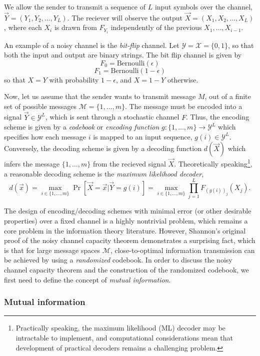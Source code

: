 We allow the sender to transmit a sequence of $L$ input symbols over
the channel, $\vec{Y} = (Y_1,Y_2,\hdots, Y_L)$. The reciever will observe the
output $\vec{X} = (X_1,X_2,\hdots, X_L)$, where each $X_i$ is drawn from
$F_{Y_i}$ independently of the previous $X_1,\hdots, X_{i-1}$.

An example of a noisy channel is the \emph{bit-flip} channel.
Let $\mathcal{Y} = \mathcal{X} = \{0,1\}$, so that both the input and output are binary strings.
The bit flip channel is given by
\[
F_0 = \text{Bernoulli}(\epsilon)
\]
\[
F_1 = \text{Bernoulli}(1-\epsilon)
\]
so that $X = Y$ with probability $1-\epsilon$, and $X = 1-Y$
otherwise.

Now, let us assume that the sender wants to transmit message $M$, out
of a finite set of possible messages $\mathcal{M} = \{1,\hdots, m\}$.
The message must be encoded into a signal $\vec{Y} \in \mathcal{Y}^L$,
which is sent through a stochastic channel $F$.  Thus, the encoding
scheme is given by a \emph{codebook} or \emph{encoding function} $g:
\{1,\hdots, m\} \to \mathcal{Y}^L$ which specifies how each message
$i$ is mapped to an input sequence, $g(i) \in \mathcal{Y}^L$.
Conversely, the decoding scheme is given by a decoding function
$d(\vec{X})$ which infers the message $\{1,\hdots, m\}$ from the
recieved signal $\vec{X}$.  Theoretically
speaking\footnote{Practically speaking, the maximum likelihood (ML)
  decoder may be intractable to implement, and computational
  considerations mean that development of practical decoders remains a
  challenging problem.}, a reasonable decoding scheme is the
\emph{maximum likelihood decoder},
\[
d(\vec{x}) = \max_{i \in \{1,\hdots, m\}} \Pr[\vec{X} = \vec{x}| \vec{Y} = g(i)] = \max_{i \in \{1,\hdots, m\}} \prod_{j=1}^L F_{(g(i))_j}(X_j).
\]

The design of encoding/decoding schemes with minimal error (or other
desirable properties) over a fixed channel is a highly nontrivial
problem, which remains a core problem in the information theory
literature.  However, Shannon's original proof of the noisy channel
capacity theorem demonstrates a surprising fact, which is that for
large message spaces $\mathcal{M}$, close-to-optimal information
transmission can be achieved by using a \emph{randomized} codebook.
In order to discuss the noisy channel capacity theorem and the
construction of the randomized codebook, we first need to define
the concept of \emph{mutual information}.

\subsubsection{Mutual information}

